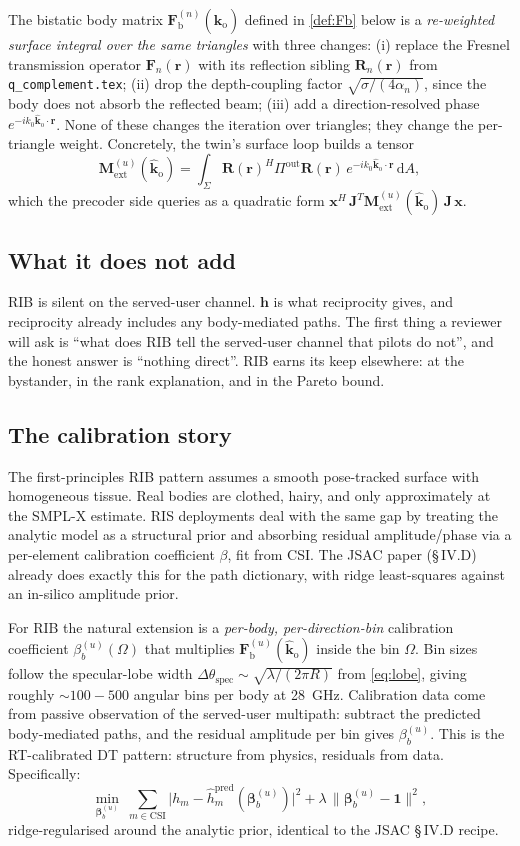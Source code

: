 \documentclass[11pt,a4paper]{article}
\theoremstyle{definition}
\newcommand{\rr}{\mathbf{r}}
\newcommand{\diff}{\mathrm{d}}
\newcommand{\Fn}{\mathbf{F}_{\!n}}
\newcommand{\Rn}{\mathbf{R}_{\!n}}
\newcommand{\kout}{\hat{\bm{k}}_{\mathrm{o}}}
\newcommand{\Frib}{\mathbf{F}_{\mathrm{b}}}
\newcommand{\hh}{\mathbf{h}}
\newcommand{\Jmat}{\mathbf{J}}
\begin{document}
The bistatic body matrix $\Frib^{(n)}(\kout)$ defined in
\cref{def:Fb} below is a \emph{re-weighted surface integral over
the same triangles} with three changes: (i) replace the Fresnel
transmission operator $\Fn(\rr)$ with its reflection sibling
$\Rn(\rr)$ from \texttt{q\_complement.tex}; (ii) drop the
depth-coupling factor $\sqrt{\sigma/(4\alpha_n)}$, since the body
does not absorb the reflected beam; (iii) add a
direction-resolved phase $e^{-ik_0\kout\cdot\rr}$.  None of these
changes the iteration over triangles; they change the per-triangle
weight.  Concretely, the twin's surface loop builds a tensor
\[
  \mathbf{M}^{(u)}_{\mathrm{ext}}(\kout)
  = \int_\Sigma \mathbf{R}(\rr)^H\Pi^{\mathrm{out}}\mathbf{R}(\rr)\,
                e^{-ik_0\kout\cdot\rr}\,\diff A,
\]
which the precoder side queries as a quadratic form
$\mathbf{x}^H\,\Jmat^T\mathbf{M}^{(u)}_{\mathrm{ext}}(\kout)\,\Jmat\,\mathbf{x}$.

\subsection{What it does not add}

RIB is silent on the served-user channel.  $\hh$ is what reciprocity
gives, and reciprocity already includes any body-mediated paths.
The first thing a reviewer will ask is ``what does RIB tell the
served-user channel that pilots do not'', and the honest answer is
``nothing direct''.  RIB earns its keep elsewhere: at the bystander,
in the rank explanation, and in the Pareto bound.

\subsection{The calibration story}\label{sec:calib}

The first-principles RIB pattern assumes a smooth pose-tracked
surface with homogeneous tissue.  Real bodies are clothed, hairy,
and only approximately at the SMPL-X estimate.  RIS deployments deal
with the same gap by treating the analytic model as a structural
prior and absorbing residual amplitude/phase via a per-element
calibration coefficient $\beta$, fit from CSI.  The JSAC paper
(\S\,IV.D) already does exactly this for the path dictionary, with
ridge least-squares against an in-silico amplitude prior.

For RIB the natural extension is a \emph{per-body, per-direction-bin}
calibration coefficient $\beta_b^{(u)}(\Omega)$ that multiplies
$\Frib^{(u)}(\kout)$ inside the bin $\Omega$.  Bin sizes follow the
specular-lobe width $\Delta\theta_{\mathrm{spec}}\sim
\sqrt{\lambda/(2\pi R)}$ from \cref{eq:lobe}, giving roughly
$\sim 100{-}500$ angular bins per body at \SI{28}{GHz}.
Calibration data come from passive observation of the served-user
multipath: subtract the predicted body-mediated paths, and the
residual amplitude per bin gives $\beta_b^{(u)}$.  This is the
RT-calibrated DT pattern: structure from physics, residuals from
data.  Specifically:
\[
   \min_{\bm\beta_b^{(u)}}\;
   \sum_{m\in\mathrm{CSI}}\bigl|h_m
       -\hat h_m^{\mathrm{pred}}(\bm\beta_b^{(u)})\bigr|^2
   +\lambda\,\|\bm\beta_b^{(u)}-\bm 1\|^2,
\]
ridge-regularised around the analytic prior, identical to the JSAC
\S\,IV.D recipe.
\end{document}
